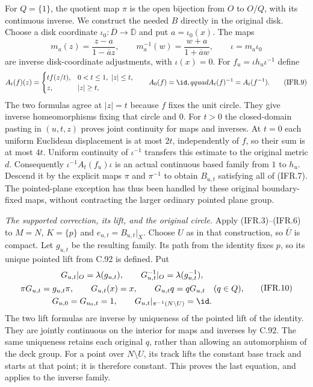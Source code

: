For $Q=\{1\}$, the quotient map $\pi$ is the open bijection
from $O$ to $O/Q$, with its continuous inverse. We construct the
needed $B$ directly in the original disk. Choose a disk coordinate
$\iota_0:\overline D\to\overline{\mathbb D}$ and put $a=\iota_0(x)$.
The maps
\[
 m_a(z)=\frac{z-a}{1-\overline a z},\qquad
 m_a^{-1}(w)=\frac{w+a}{1+\overline a w},\qquad
 \iota=m_a\iota_0
                                                               \tag{IFR.8}
\]
are inverse disk-coordinate adjustments, with $\iota(x)=0$.
For $f_u=\iota h_u\iota^{-1}$ define
\[
 A_t(f)(z)=
 \begin{cases}
  t f(z/t),&0<t\leq1,\ |z|\leq t,\\
  z,&|z|\geq t,
 \end{cases}
 \qquad A_0(f)=\id,qquad A_t(f)^{-1}=A_t(f^{-1}).                \tag{IFR.9}
\]
The two formulas agree at $|z|=t$ because $f$ fixes the unit circle.
They give inverse homeomorphisms fixing that circle and $0$.
For $t>0$ the closed-domain pasting in $(u,t,z)$ proves joint
continuity for maps and inverses. At $t=0$ each uniform Euclidean
displacement is at most $2t$, independently of $f$, so their sum
is at most $4t$. Uniform continuity of $\iota^{-1}$ transfers
this estimate to the original metric $d$. Consequently
$\iota^{-1}A_t(f_u)\iota$ is an actual continuous based family
from $1$ to $h_u$. Descend it by the explicit maps $\pi$ and
$\pi^{-1}$ to obtain $B_{u,t}$ satisfying all of (IFR.7).
The pointed-plane exception has thus been handled by these original
boundary-fixed maps, without contracting the larger ordinary pointed
plane group.

\emph{The supported correction, its lift, and the original circle.}
Apply (IFR.3)--(IFR.6) to $M=N$, $K=\{p\}$ and
$e_{u,t}=B_{u,t}|_X$. Choose $U$ as in that construction, so
$\overline U$ is compact. Let $g_{u,t}$ be the resulting family.
Its path from the identity fixes $p$, so its unique pointed lift
from C.92 is defined. Put
\[
\begin{gathered}
 G_{u,t}|_O=\lambda(g_{u,t}),\qquad
 G_{u,t}^{-1}|_O=\lambda(g_{u,t}^{-1}),\\
 \pi G_{u,t}=g_{u,t}\pi,\qquad
 G_{u,t}(x)=x,\qquad G_{u,t}q=qG_{u,t}\quad(q\in Q),\\
 G_{u,0}=G_{u_0,t}=1,\qquad
 G_{u,t}|_{\pi^{-1}(N\setminus U)}=\id.
\end{gathered}                                                    \tag{IFR.10}
\]
The two lift formulas are inverse by uniqueness of the pointed lift
of the identity. They are jointly continuous on the interior for
maps and inverses by C.92. The same uniqueness retains each original
$q$, rather than allowing an automorphism of the deck group.
For a point over $N\setminus U$, its track lifts the constant
base track and starts at that point; it is therefore constant.
This proves the last equation, and applies to the inverse family.

